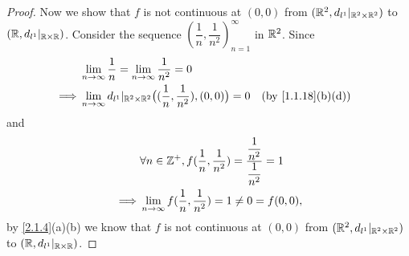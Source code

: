 \begin{proof}
  Now we show that \(f\) is not continuous at \((0, 0)\) from \((\mathbb{R}^2, d_{l^1}|_{\mathbb{R}^2 \times \mathbb{R}^2})\) to \((\mathbb{R}, d_{l^1}|_{\mathbb{R} \times \mathbb{R}})\).
  Consider the sequence \((\dfrac{1}{n}, \dfrac{1}{n^2})_{n = 1}^\infty\) in \(\mathbb{R}^2\).
  Since
  \begin{align*}
             & \lim_{n \to \infty} \dfrac{1}{n} = \lim_{n \to \infty} \dfrac{1}{n^2} = 0                                                                \\
    \implies & \lim_{n \to \infty} d_{l^1}|_{\R^2 \times \R^2}\big((\dfrac{1}{n}, \dfrac{1}{n^2}), (0, 0)\big) = 0 &  & \text{(by \cref{1.1.18}(b)(d))}
  \end{align*}
  and
  \begin{align*}
             & \forall n \in \mathbb{Z}^+, f(\dfrac{1}{n}, \dfrac{1}{n^2}) = \dfrac{\dfrac{1}{n^2}}{\dfrac{1}{n^2}} = 1 \\
    \implies & \lim_{n \to \infty} f(\dfrac{1}{n}, \dfrac{1}{n^2}) = 1 \neq 0 = f(0, 0),
  \end{align*}
  by \cref{2.1.4}(a)(b) we know that \(f\) is not continuous at \((0, 0)\) from \((\mathbb{R}^2, d_{l^1}|_{\mathbb{R}^2 \times \mathbb{R}^2})\) to \((\mathbb{R}, d_{l^1}|_{\mathbb{R} \times \mathbb{R}})\).
\end{proof}
